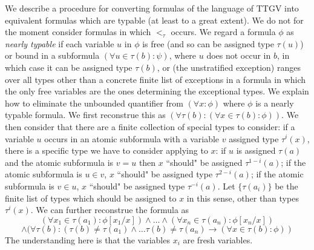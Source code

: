 \documentclass[12pt]{article}
\begin{document}
We describe a procedure for converting formulas of the language of TTGV into equivalent formulas which are typable (at least to a great extent).    We do not for the moment consider formulas in which $<_\tau$ occurs.  We regard a formula $\phi$ as {\em nearly typable\/} if each variable $u$ in $\phi$ is free (and so can be assigned type $\tau(u)$) or bound in a subformula $(\forall u \in \tau(b):\psi)$, where $u$ does not occur in $b$,
in which case it can be assigned type $\tau(b)$, or (the unstratified exception) ranges over all types other than a concrete finite list of exceptions in a formula in which the only free variables are the ones determining the exceptional types.   We explain how to eliminate the unbounded quantifier from $(\forall x:\phi)$ where $\phi$ is a nearly typable formula.  We first reconstrue this as $(\forall \tau(b):(\forall x \in \tau(b):\phi))$.  We then consider that there are a finite collection of special types to consider:  if a variable $u$ occurs in an atomic subformula
with a variable $v$ assigned type $\tau^i(x)$, there is a specific type we have to consider applying to $x$:  if $u$ is assigned $\tau(a)$ and the atomic subformula is $v=u$ then $x$ ``should" be assigned $\tau^{1-i}(a)$;  if  the atomic subformula is $u \in v$, $x$ ``should" be assigned type $\tau^{2-i}(a)$;   if  the atomic subformula is $v \in u$, $x$ ``should" be assigned type $\tau^{-i}(a)$.  Let $\{\tau(a_i)\}$
be the finite list of types which should be assigned to $x$ in this sense, other than types $\tau^i(x)$.  We can further reconstrue the formula as $$(\forall x_1 \in \tau(a_1):\phi[x_1/x]) \wedge \ldots \wedge (\forall x_n \in \tau(a_n):\phi[x_n/x]) $$ $$\wedge (\forall \tau(b):(\tau(b) \neq \tau(a_1) \wedge \ldots \tau(b) \neq \tau(a_n) \rightarrow (\forall x \in \tau(b):\phi))$$
The understanding here is that the variables $x_i$ are fresh variables.
\end{document}
